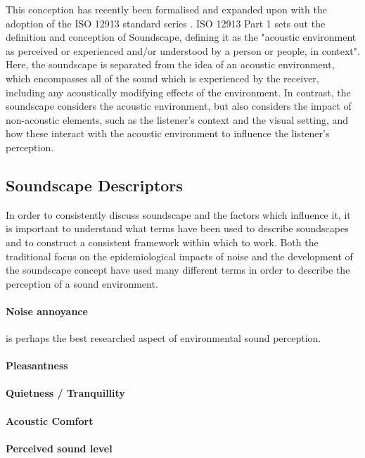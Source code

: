    This conception has recently been formalised and expanded upon with the adoption of the ISO 12913 standard series \cite{ISO2018}. ISO 12913 Part 1 sets out the definition and conception of Soundscape, defining it as the "acoustic environment as perceived or experienced and/or understood by a person or people, in context". Here, the soundscape is separated from the idea of an acoustic environment, which encompasses all of the sound which is experienced by the receiver, including any acoustically modifying effects of the environment. In contrast, the soundscape considers the acoustic environment, but also considers the impact of non-acoustic elements, such as the listener's context and the visual setting, and how these interact with the acoustic environment to influence the listener's perception.

  \subsection{Soundscape Descriptors}
    In order to consistently discuss soundscape and the factors which influence it, it is important to understand what terms have been used to describe soundscapes and to construct a consistent framework within which to work. Both the traditional focus on the epidemiological impacts of noise and the development of the soundscape concept have used many different terms in order to describe the perception of a sound environment.

    \paragraph{Noise annoyance} is perhaps the best researched aspect of environmental sound perception.

    \paragraph{Pleasantness}

    \paragraph{Quietness / Tranquillity}

    \paragraph{Acoustic Comfort}

    \paragraph{Perceived sound level}

